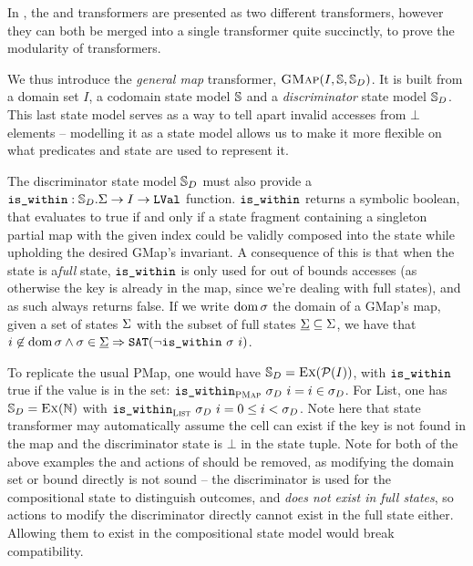In \cite{sacha-phd}, the \PMap{} and \List{} transformers are presented as two different transformers, however they can both be merged into a single transformer quite succinctly, to prove the modularity of transformers.

We thus introduce the \emph{general map} transformer, $\textsc{GMap}(I,\mathbb S,\mathbb S_D)$. It is built from a domain set $I$, a codomain state model $\mathbb S$ and a \emph{discriminator} state model $\mathbb S_D$. This last state model serves as a way to tell apart invalid accesses from $\bot$ elements -- modelling it as a state model allows us to make it more flexible on what predicates and state are used to represent it.

The discriminator state model $\mathbb S_D$ must also provide a $\texttt{is\_within}:\mathbb S_D.\Sigma\rightarrow I\rightarrow \texttt{LVal}$ function. $\texttt{is\_within}$ returns a symbolic boolean, that evaluates to true if and only if a state fragment containing a singleton partial map with the given index could be validly composed into the state while upholding the desired GMap's invariant. A consequence of this is that when the state is a\emph{full} state, $\texttt{is\_within}$ is only used for out of bounds accesses (as otherwise the key is already in the map, since we're dealing with full states), and as such always returns false. If we write $\operatorname{dom} \sigma$ the domain of a GMap's map, given a set of states $\Sigma$ with the subset of full states $\underline{\Sigma}\subseteq\Sigma$, we have that $i\not\in \operatorname{dom}\sigma \land \sigma \in \underline{\Sigma} \Rightarrow \operatorname{\texttt{SAT}}(\neg\texttt{is\_within}~\sigma~i)$.

To replicate the usual PMap, one would have $\mathbb S_D=\textsc{Ex}({\cal P}(I))$, with $\texttt{is\_within}$ true if the value is in the set: $\texttt{is\_within}_{\textsc{PMap}}~\sigma_D~i=i\in\sigma_D$. For List, one has $\mathbb S_D=\textsc{Ex}(\mathbb N)$ with $\texttt{is\_within}_{\textsc{List}}~\sigma_D~i=0 \leq i < \sigma_D$. Note here that state transformer may automatically assume the cell can exist if the key is not found in the map and the discriminator state is $\bot$ in the state tuple. Note for both of the above examples the \load{} and \store{} actions of \Ex{} should be removed, as modifying the domain set or bound directly is not sound -- the discriminator is used for the compositional state to distinguish outcomes, and \emph{does not exist in full states}, so actions to modify the discriminator directly cannot exist in the full state either. Allowing them to exist in the compositional state model would break compatibility.

